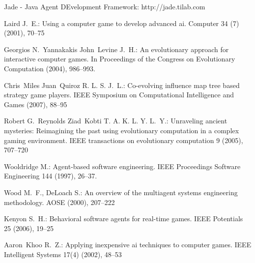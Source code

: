 \documentclass[10pt,journal,letterpaper,compsoc]{IEEEtran}
\begin{document}
\begin{thebibliography}{28}
Jade - Java Agent DEvelopment Framework:
http://jade.tilab.com

Laird J.~E.:
Using a computer game to develop advanced ai.
Computer 34 (7) (2001), 70--75

Georgios N.~Yannakakis John~Levine J.~H.:
An evolutionary approach for interactive computer games.
In Proceedings of the Congress on Evolutionary Computation (2004), 986--993.

Chris~Miles Juan~Quiroz R. L. S. J.~L.:
Co-evolving influence map tree based strategy game players.
IEEE Symposium on Computational Intelligence and Games (2007), 88--95

Robert G.~Reynolds Ziad~Kobti T. A. K. L. Y. L.~Y.:
Unraveling ancient mysteries: Reimagining the past using evolutionary
  computation in a complex gaming environment.
IEEE transactions on evolutionary computation 9 (2005), 707--720

Wooldridge M.:
Agent-based software engineering.
IEEE Proceedings Software Engineering 144 (1997), 26--37.

Wood M.~F., DeLoach S.:
An overview of the multiagent systems engineering methodology.
AOSE (2000), 207--222

Kenyon S.~H.:
Behavioral software agents for real-time games.
IEEE Potentials 25 (2006), 19--25

Aaron~Khoo R.~Z.:
Applying inexpensive ai techniques to computer games.
IEEE Intelligent Systems 17(4) (2002), 48--53

\end{thebibliography}



% 
\end{document}
